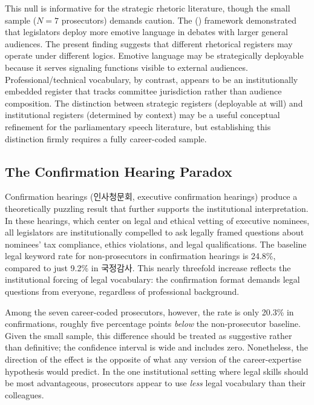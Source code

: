 \documentclass[11pt]{article}
\begin{document}
This null is informative for the strategic rhetoric literature, though the small sample ($N = 7$ prosecutors) demands caution. The \citeauthor{osnabrugge2021} (\citeyear{osnabrugge2021}) framework demonstrated that legislators deploy more emotive language in debates with larger general audiences. The present finding suggests that different rhetorical registers may operate under different logics. Emotive language may be strategically deployable because it serves signaling functions visible to external audiences. Professional/technical vocabulary, by contrast, appears to be an institutionally embedded register that tracks committee jurisdiction rather than audience composition. The distinction between strategic registers (deployable at will) and institutional registers (determined by context) may be a useful conceptual refinement for the parliamentary speech literature, but establishing this distinction firmly requires a fully career-coded sample.

\subsection{The Confirmation Hearing Paradox}

Confirmation hearings (인사청문회, executive confirmation hearings) produce a theoretically puzzling result that further supports the institutional interpretation. In these hearings, which center on legal and ethical vetting of executive nominees, all legislators are institutionally compelled to ask legally framed questions about nominees' tax compliance, ethics violations, and legal qualifications. The baseline legal keyword rate for non-prosecutors in confirmation hearings is 24.8\%, compared to just 9.2\% in 국정감사. This nearly threefold increase reflects the institutional forcing of legal vocabulary: the confirmation format demands legal questions from everyone, regardless of professional background.

Among the seven career-coded prosecutors, however, the rate is only 20.3\% in confirmations, roughly five percentage points \textit{below} the non-prosecutor baseline. Given the small sample, this difference should be treated as suggestive rather than definitive; the confidence interval is wide and includes zero. Nonetheless, the direction of the effect is the opposite of what any version of the career-expertise hypothesis would predict. In the one institutional setting where legal skills should be most advantageous, prosecutors appear to use \textit{less} legal vocabulary than their colleagues.
\end{document}
